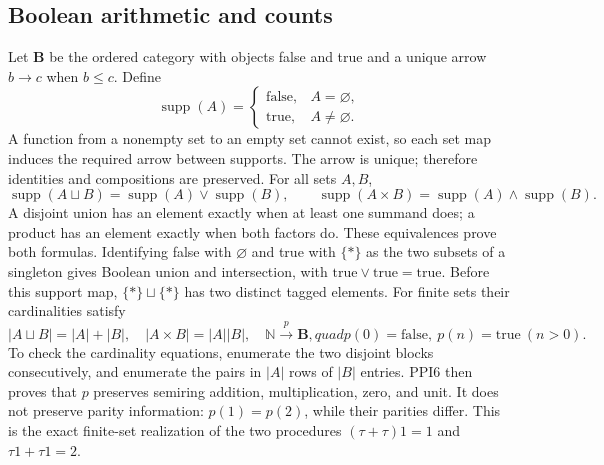 \subsection{Boolean arithmetic and counts}
Let $\mathbf B$ be the ordered category with objects false and
true and a unique arrow $b\to c$ when $b\le c$. Define
\begin{equation}\tag{PPI5}
\operatorname{supp}(A)=
\begin{cases}\mathrm{false},&A=\varnothing,\\
\mathrm{true},&A\ne\varnothing.
\end{cases}
\end{equation}
A function from a nonempty set to an empty set cannot exist, so
each set map induces the required arrow between supports. The
arrow is unique; therefore identities and compositions are
preserved. For all sets $A,B$,
\begin{equation}\tag{PPI6}
\operatorname{supp}(A\sqcup B)
=\operatorname{supp}(A)\vee\operatorname{supp}(B),\qquad
\operatorname{supp}(A\times B)
=\operatorname{supp}(A)\wedge\operatorname{supp}(B).
\end{equation}
A disjoint union has an element exactly when at least one summand
does; a product has an element exactly when both factors do.
These equivalences prove both formulas. Identifying false with
$\varnothing$ and true with $\{*\}$ as the two subsets of a
singleton gives Boolean union and intersection, with
$\mathrm{true}\vee\mathrm{true}=\mathrm{true}$.
Before this support map, $\{*\}\sqcup\{*\}$ has two distinct
tagged elements. For finite sets their cardinalities satisfy
\begin{equation}\tag{PPI7}
|A\sqcup B|=|A|+|B|,\quad |A\times B|=|A||B|,\quad
\mathbb N\xrightarrow{p}\mathbf B,quad
p(0)=\mathrm{false},\ p(n)=\mathrm{true}\ (n>0).
\end{equation}
To check the cardinality equations, enumerate the two disjoint
blocks consecutively, and enumerate the pairs in $|A|$ rows of
$|B|$ entries. PPI6 then proves that $p$ preserves semiring
addition, multiplication, zero, and unit. It does not preserve
parity information: $p(1)=p(2)$, while their parities differ.
This is the exact finite-set realization of the two procedures
$(\tau+\tau)1=1$ and $\tau1+\tau1=2$.

